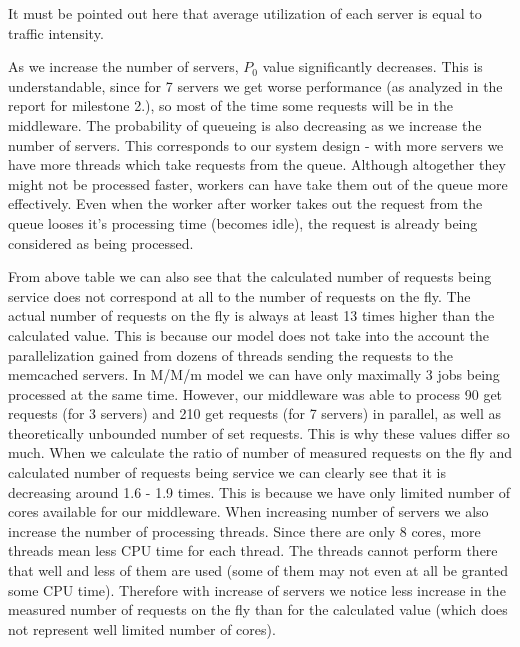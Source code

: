 \documentclass[11pt]{article}
\begin{document}
It must be pointed out here that average utilization of each server is equal to traffic intensity. 

As we increase the number of servers, $P_0$ value significantly decreases. This is understandable, since for 7 servers we get worse performance (as analyzed in the report for milestone 2.), so most of the time some requests will be in the middleware. 
The probability of queueing is also decreasing as we increase the number of servers. This corresponds to our system design - with more servers we have more threads which take requests from the queue. Although altogether they might not be processed faster, workers can have take them out of the queue more effectively. Even when the worker after worker takes out the request from the queue looses it's processing time (becomes idle), the request is already being considered as being processed. %

From above table we can also see that the calculated number of requests being service does not correspond at all to the number of requests on the fly. The actual number of requests on the fly is always at least 13 times higher than the calculated value. 
This is because our model does not take into the account the parallelization gained from dozens of threads sending the requests to the memcached servers. In M/M/m model we can have only maximally 3 jobs being processed at the same time. However, our middleware was able to process 90 get requests (for 3 servers) and 210 get requests (for 7 servers) in parallel, as well as theoretically unbounded number of set requests. This is why these values differ so much. When we calculate the ratio of number of measured requests on the fly and calculated number of requests being service we can clearly see that it is decreasing around 1.6 - 1.9 times. This is because we have only limited number of cores available for our middleware. When increasing number of servers we also increase the number of processing threads. Since there are only 8 cores, more threads mean less CPU time for each thread. The threads cannot perform there that well and less of them are used (some of them may not even at all be granted some CPU time). Therefore with increase of servers we notice less increase in the measured number of requests on the fly than for the calculated value (which does not represent well limited number of cores). 

 
\end{document}

